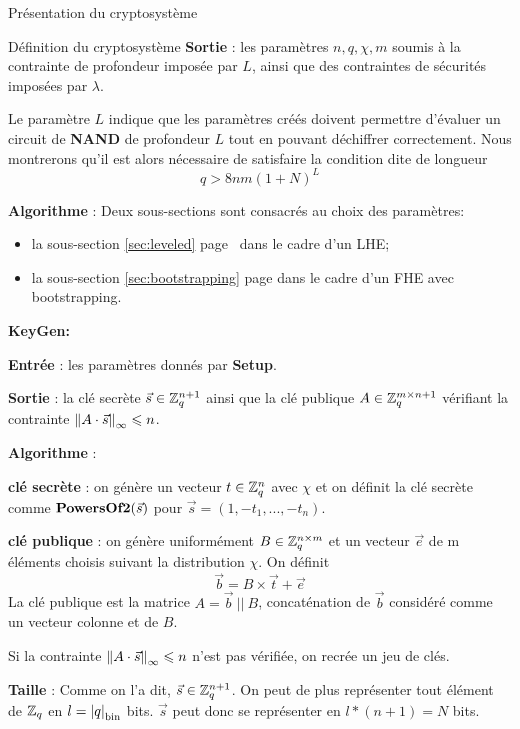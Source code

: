 \begin{section}{Présentation du cryptosystème}
\begin{subsection}{Définition du cryptosystème}
	\textbf{Sortie} : les paramètres $n, q, \chi, m$ soumis à la contrainte de profondeur imposée par $L$, ainsi que
	des contraintes de sécurités imposées par $\lambda$.

	Le paramètre $L$ indique que les paramètres créés doivent permettre d'évaluer un circuit de \textbf{NAND} de profondeur $L$ tout en pouvant déchiffrer correctement. Nous montrerons qu'il est alors nécessaire de satisfaire la condition dite \og de longueur \fg~  
	\[q > 8nm (1 + N)^L \]

	\textbf{Algorithme} : Deux sous-sections sont consacrés au choix des paramètres:
	\begin{itemize}
	\item la sous-section \ref{sec:leveled} page \pageref{sec:leveled} dans le cadre d'un LHE;
	\item la sous-section \ref{sec:bootstrapping} page \pageref{sec:bootstrapping} dans le cadre d'un FHE avec
	bootstrapping.
	\end{itemize}
	
\begin{samepage}
\vspace{0.5cm}\noindent\textbf{KeyGen:}
\flushleft
	
	\textbf{Entrée} : les paramètres donnés par \textbf{Setup}.

	\textbf{Sortie} : la clé secrète $\vec{s} \in
	\mathbb{Z}_q^{n+1}$ ainsi que la clé publique $A \in \mathbb{Z}_q^{m \times n+1}$ vérifiant la contrainte 
	${\|A \cdot \vec{s}\|}_{\infty} \leqslant n$.
\end{samepage}

	\textbf{Algorithme} :

	\textbf{clé secrète} : on génère un vecteur $t \in \mathbb{Z}_q^n$ avec $\chi$ et on définit la clé secrète comme $\text{\textbf{PowersOf2}}(\vec{s})$ pour $\vec{s} = (1, -t_1, ..., -t_n)$.

	\textbf{clé publique} : on génère uniformément $B \in \mathbb{Z}_q^{n \times m}$ et un vecteur $\vec{e}$ de m éléments
	choisis suivant la distribution $\chi$. On définit 
	\[\vec{b} = B \times \vec{t} + \vec{e}\]  
	La clé publique est la matrice $A = \vec{b}\: || \:B$, concaténation de $\vec{b}$ considéré comme
	un vecteur colonne et de $B$.

	Si la contrainte ${\|A \cdot \vec{s}\|}_{\infty} \leqslant n$ n'est pas vérifiée, on recrée un jeu de clés.

	\textbf{Taille} : Comme on l'a dit, $\vec{s} \in \mathbb{Z}_q^{n+1}$. On peut de plus représenter tout élément de
	$\mathbb{Z}_q$ en $l = {|q|}_{\text{bin}}$ bits.  $\vec{s}$ peut donc se représenter en  $l * (n+1) = N$ bits.


\end{subsection}
\end{section}
